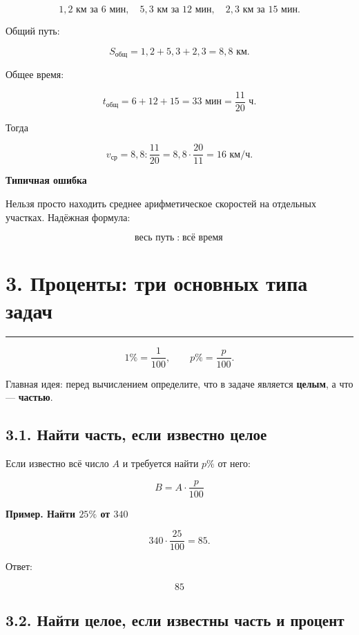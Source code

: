 \documentclass[a4paper,12pt]{article}
\newcommand{\sectionline}{%
    \vspace{0.2em}
    {\color{accent}\rule{\linewidth}{0.6pt}}
    \vspace{0.5em}
}
\newcommand{\important}[1]{%
    \par\medskip
    {\color{darkaccent}\textbf{#1}}
    \par\smallskip
}
\newcommand{\exampletitle}[1]{%
    \par\medskip
    {\color{accent}\textbf{Пример. #1}}
    \par\smallskip
}
\begin{document}
\[
1{,}2\text{ км за }6\text{ мин},
\quad
5{,}3\text{ км за }12\text{ мин},
\quad
2{,}3\text{ км за }15\text{ мин}.
\]

Общий путь:

\[
S_{\text{общ}}
=
1{,}2+5{,}3+2{,}3
=
8{,}8\text{ км}.
\]

Общее время:

\[
t_{\text{общ}}
=
6+12+15
=
33\text{ мин}
=
\frac{11}{20}\text{ ч}.
\]

Тогда

\[
v_{\text{ср}}
=
8{,}8:\frac{11}{20}
=
8{,}8\cdot\frac{20}{11}
=
16\text{ км/ч}.
\]

\important{Типичная ошибка}

Нельзя просто находить среднее арифметическое скоростей на отдельных участках.
Надёжная формула:

\[
\boxed{\text{весь путь}\;:\;\text{всё время}}
\]

\section*{\color{darkaccent}3. Проценты: три основных типа задач}
\sectionline

\[
1\%=\frac{1}{100},
\qquad
p\%=\frac{p}{100}.
\]

Главная идея: перед вычислением определите, что в задаче является
\textbf{целым}, а что --- \textbf{частью}.

\subsection*{\color{accent}3.1. Найти часть, если известно целое}

Если известно всё число \(A\) и требуется найти \(p\%\) от него:

\[
\boxed{
B=A\cdot\frac{p}{100}
}
\]

\exampletitle{Найти \(25\%\) от \(340\)}

\[
340\cdot\frac{25}{100}
=
85.
\]

Ответ:

\[
\boxed{85}
\]

\medskip


\subsection*{\color{accent}3.2. Найти целое, если известны часть и процент}
\end{document}
